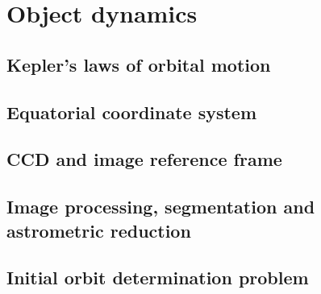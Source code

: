 \chapter{Object dynamics}\label{chap:object_dynamics}

\section{Kepler's laws of orbital motion}\label{sec:kepler}

\section{Equatorial coordinate system}\label{sec:ra_dec}

\section{CCD and image reference frame}\label{sec:ccd}

\section{Image processing, segmentation and astrometric reduction}\label{sec:proc_seg_reduc}

\section{Initial orbit determination problem}\label{sec:init_orbit_det}